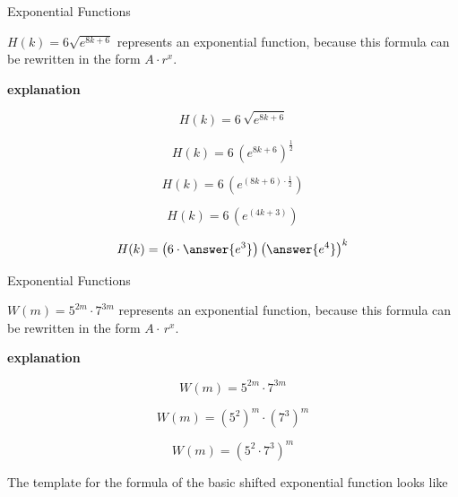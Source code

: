 \documentclass{ximera}
\begin{document}
\begin{example}  Exponential Functions 



$H(k) = 6 \sqrt{e^{8 k + 6}} $ represents an exponential function, because this formula can be rewritten in the form $A \cdot r^x$.   



\textbf{\textcolor{red!75!green}{explanation}} 


\[
H(k) = 6 \, \sqrt{e^{8 k + 6}}
\]


\[
H(k) = 6 \, \left( e^{8 k + 6} \right)^{\tfrac{1}{2}}
\]

\[
H(k) = 6 \, \left( e^{(8 k + 6 ) \cdot \tfrac{1}{2}} \right)
\]

\[
H(k) = 6 \, \left( e^{(4 k + 3)} \right)
\]

\[
H(k) = \left( 6 \cdot \answer{e^3} \right) \left( \answer{e^4} \right)^k
\]




\end{example}

















\begin{example}  Exponential Functions 



$W(m) = 5^{2 m} \cdot 7^{3 m}$ represents an exponential function, because this formula can be rewritten in the form $A \cdot \, r^x$.   


\textbf{\textcolor{red!75!green}{explanation}} 


\[
W(m) = 5^{2 m} \cdot 7^{3 m}
\]


\[
W(m) = \left( 5^2 \right)^m \cdot \left( 7^3 \right)^m
\]

\[
W(m) = \left( 5^2 \cdot 7^3 \right)^m 
\]






\end{example}














The template for the formula of the basic shifted exponential function looks like
\end{document}
